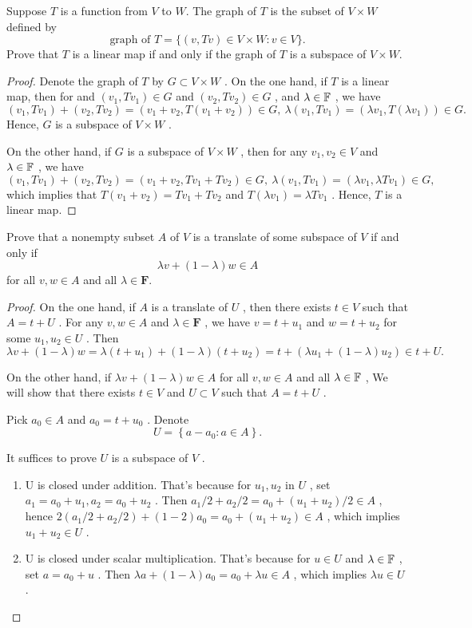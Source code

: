 \documentclass{article}
\begin{document}
\begin{problem}[3E-1]
	Suppose $T$ is a function from $V$ to $W$. The graph of $T$ is the subset of
	$V \times W$ defined by
	\[
		\text{graph of }T
		= \{(v, Tv) \in V \times W : v \in V\}.
	\]
	Prove that $T$ is a linear map if and only if the graph of $T$ is a subspace
	of $V \times W$.
\end{problem}

\begin{proof}
	Denote the graph of \( T \) by \( G\subset V\times W \) . On the one hand, if \( T \) is a linear map, then for and \( (v_1,Tv_1)\in G \) and  \( (v_2,Tv_2)\in G \) , and  \( \lambda\in\mathbb{F} \) , we have
	\[ (v_1,Tv_1)+(v_2,Tv_2)=(v_1+v_2,T(v_1+v_2))\in G,\ \lambda(v_1,Tv_1)=(\lambda v_1,T(\lambda v_1))\in G. \] 
	Hence, \( G \) is a subspace of \( V\times W \) .\par
	On the other hand, if \( G \) is a subspace of \( V\times W \) , then for any \( v_1,v_2\in V \) and \( \lambda\in\mathbb{F} \) , we have
	\[ (v_1,Tv_1)+(v_2,Tv_2)=(v_1+v_2,Tv_1+Tv_2)\in G,\ \lambda(v_1,Tv_1)=(\lambda v_1,\lambda Tv_1)\in G, \]
	which implies that \( T(v_1+v_2)=Tv_1+Tv_2 \) and \( T(\lambda v_1)=\lambda Tv_1 \) . Hence, \( T \) is a linear map.
\end{proof}

\begin{problem}[3E-9]
	Prove that a nonempty subset $A$ of $V$ is a translate of some subspace of
	$V$ if and only if
	\[
		\lambda v + (1 - \lambda)w \in A
	\]
	for all $v, w \in A$ and all $\lambda \in \mathbf{F}$.
\end{problem}

\begin{proof}
	On the one hand, if \( A \) is a translate of \( U \) , then there exists \( t \in V \) such that \( A = t + U \) . For any \( v, w \in A \) and \( \lambda \in \mathbf{F} \) , we have \( v = t + u_1 \) and \( w = t + u_2 \) for some \( u_1, u_2 \in U \) . Then
	\[ \lambda v+ (1-\lambda)w= \lambda(t+u_1)+(1-\lambda)(t+u_2)=t+(\lambda u_1+ (1-\lambda) u_2)\in t+U. \] \par
	On the other hand, if \( \lambda v + (1 - \lambda)w \in A \) for all \( v, w \in A \) and all \( \lambda \in \mathbb{F} \) , We will show that there exists  \( t\in V \) and \( U\subset V \) such that \( A=t+U \) . \par
	Pick \( a_0\in A \) and  \( a_0=t+u_0 \) . Denote
	\[ U=\left\{a-a_0:a\in A\right\}. \] \par
	It suffices to prove \( U \) is a subspace of \( V \) . 
	\begin{enumerate}[label=(\alph*)]
		\item U is closed under addition. That's because for \( u_1,u_2 \) in \( U \) , set \( a_1=a_0+u_1, a_2=a_0+u_2 \) . Then \( a_1/2+a_2/2=a_0+(u_1+u_2)/2\in A \) , hence \( 2(a_1/2+a_2/2)+(1-2)a_0=a_0+(u_1+u_2)\in A \) , which implies \( u_1+u_2\in U \) . 
		\item U is closed under scalar multiplication. That's because for \( u\in U \) and \( \lambda\in\mathbb{F} \) , set \( a=a_0+u \) . Then \( \lambda a+(1-\lambda)a_0=a_0+\lambda u\in A \) , which implies \( \lambda u\in U \) .
	\end{enumerate}
\end{proof}
\end{document}
